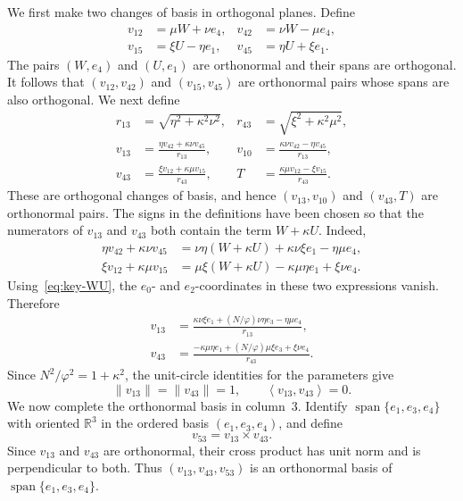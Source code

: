 \documentclass[11pt]{article}
\theoremstyle{definition}
\newcommand{\R}{\mathbb R}
\newcommand{\spn}{\operatorname{span}}
\newcommand{\ip}[2]{\left\langle #1,#2\right\rangle}
\begin{document}
We first make two changes of basis in orthogonal planes.  Define
\begin{align}
v_{12}&=\mu W+\nu e_4,&
v_{42}&=\nu W-\mu e_4,\label{eq:v1242}\\
v_{15}&=\xi U-\eta e_1,&
v_{45}&=\eta U+\xi e_1.\label{eq:v1545}
\end{align}
The pairs $(W,e_4)$ and $(U,e_1)$ are orthonormal and their spans are
orthogonal.  It follows that $(v_{12},v_{42})$ and $(v_{15},v_{45})$ are
orthonormal pairs whose spans are also orthogonal.  We next define
\begin{align}
r_{13}&=\sqrt{\eta^2+\kappa^2\nu^2},&
r_{43}&=\sqrt{\xi^2+\kappa^2\mu^2},\label{eq:r1343}\\
v_{13}&=\frac{\eta v_{42}+\kappa\nu v_{45}}{r_{13}},&
v_{10}&=\frac{\kappa\nu v_{42}-\eta v_{45}}{r_{13}},\label{eq:v1310}\\
v_{43}&=\frac{\xi v_{12}+\kappa\mu v_{15}}{r_{43}},&
T&=\frac{\kappa\mu v_{12}-\xi v_{15}}{r_{43}}.\label{eq:v43T}
\end{align}
These are orthogonal changes of basis, and hence $(v_{13},v_{10})$ and
$(v_{43},T)$ are orthonormal pairs.  The signs in the definitions have been
chosen so that the numerators of $v_{13}$ and $v_{43}$ both contain the term
$W+\kappa U$.  Indeed,
\begin{align*}
\eta v_{42}+\kappa\nu v_{45}
  &=\nu\eta(W+\kappa U)+\kappa\nu\xi e_1-\eta\mu e_4,\\
\xi v_{12}+\kappa\mu v_{15}
  &=\mu\xi(W+\kappa U)-\kappa\mu\eta e_1+\xi\nu e_4.
\end{align*}
Using~\eqref{eq:key-WU}, the $e_0$- and $e_2$-coordinates in these two
expressions vanish.  Therefore
\begin{align}
v_{13}&=\frac{\kappa\nu\xi e_1+(N/\varphi)\nu\eta e_3
                 -\eta\mu e_4}{r_{13}},\label{eq:v13coords}\\
v_{43}&=\frac{-\kappa\mu\eta e_1+(N/\varphi)\mu\xi e_3
                 +\xi\nu e_4}{r_{43}}.\label{eq:v43coords}
\end{align}
Since $N^2/\varphi^2=1+\kappa^2$, the unit-circle identities for the
parameters give
\[
\|v_{13}\|=\|v_{43}\|=1,
\qquad
\ip{v_{13}}{v_{43}}=0.
\]
We now complete the orthonormal basis in column~$3$.  Identify
$\spn\{e_1,e_3,e_4\}$ with oriented $\R^3$ in the ordered basis
$(e_1,e_3,e_4)$, and define
\begin{equation}\label{eq:v53}
v_{53}=v_{13}\times v_{43}.
\end{equation}
Since $v_{13}$ and $v_{43}$ are orthonormal, their cross product has unit norm
and is perpendicular to both.  Thus $(v_{13},v_{43},v_{53})$ is an
orthonormal basis of $\spn\{e_1,e_3,e_4\}$.
\end{document}

